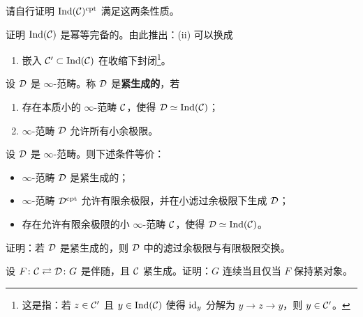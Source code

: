 \begin{exercise}\label{L13-2.3}
请自行证明 $\operatorname{Ind}(\mathcal{C})^{\mathrm{cpt}}$ 满足这两条性质。
\end{exercise}

\begin{exercise}\label{L13-2.4}
证明 $\operatorname{Ind}(\mathcal{C})$ 是幂等完备的。由此推出：(ii) 可以换成
\begin{enumerate}[label=(\roman*'),leftmargin=2.8em,itemsep=0.1em,start=2]
\item 嵌入 $\mathcal{C}'\subset\operatorname{Ind}(\mathcal{C})$ 在收缩下封闭\footnote{这是指：若 $z\in\mathcal{C}'$ 且 $y\in\operatorname{Ind}(\mathcal{C})$ 使得 $\operatorname{id}_y$ 分解为 $y\to z\to y$，则 $y\in\mathcal{C}'$。}。
\end{enumerate}
\end{exercise}

\begin{definition}\label{L13-2.5}
设 $\mathcal{D}$ 是 $\infty$-范畴。称 $\mathcal{D}$ 是\textbf{紧生成的}，若
\begin{enumerate}[label=(\alph*),leftmargin=2.4em,itemsep=0.1em]
\item 存在本质小的 $\infty$-范畴 $\mathcal{C}$，使得 $\mathcal{D}\simeq\operatorname{Ind}(\mathcal{C})$；
\item $\infty$-范畴 $\mathcal{D}$ 允许所有小余极限。
\end{enumerate}
\end{definition}

\begin{proposition}[HTT.5.5.1.1]\label{L13-2.6}
设 $\mathcal{D}$ 是 $\infty$-范畴。则下述条件等价：
\begin{itemize}[leftmargin=2.2em,itemsep=0.1em]
\item $\infty$-范畴 $\mathcal{D}$ 是紧生成的；
\item $\infty$-范畴 $\mathcal{D}^{\mathrm{cpt}}$ 允许有限余极限，并在小滤过余极限下生成 $\mathcal{D}$；
\item 存在允许有限余极限的小 $\infty$-范畴 $\mathcal{C}$，使得 $\mathcal{D}\simeq\operatorname{Ind}(\mathcal{C})$。
\end{itemize}
\end{proposition}

\begin{exercise}\label{L13-2.7}
证明：若 $\mathcal{D}$ 是紧生成的，则 $\mathcal{D}$ 中的滤过余极限与有限极限交换。
\end{exercise}

\begin{exercise}\label{L13-2.8}
设 $F\colon\mathcal{C}\rightleftarrows\mathcal{D}\colon G$ 是伴随，且 $\mathcal{C}$ 紧生成。证明：$G$ 连续当且仅当 $F$ 保持紧对象。
\end{exercise}

